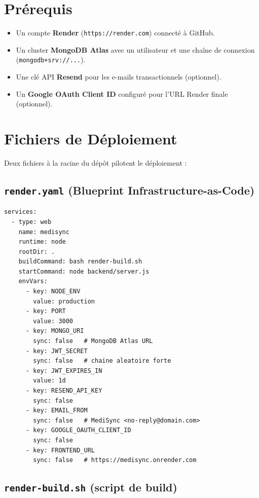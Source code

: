 \documentclass[12pt,a4paper]{report}
\begin{document}
\section{Prérequis}

\begin{itemize}[leftmargin=*,itemsep=2pt]
  \item Un compte \textbf{Render} (\texttt{https://render.com}) connecté à GitHub.
  \item Un cluster \textbf{MongoDB Atlas} avec un utilisateur et une chaîne de connexion (\texttt{mongodb+srv://...}).
  \item Une clé API \textbf{Resend} pour les e-mails transactionnels (optionnel).
  \item Un \textbf{Google OAuth Client ID} configuré pour l'URL Render finale (optionnel).
\end{itemize}

\section{Fichiers de Déploiement}

Deux fichiers à la racine du dépôt pilotent le déploiement :

\subsection{\texttt{render.yaml} (Blueprint Infrastructure-as-Code)}

\begin{lstlisting}[style=bash]
services:
  - type: web
    name: medisync
    runtime: node
    rootDir: .
    buildCommand: bash render-build.sh
    startCommand: node backend/server.js
    envVars:
      - key: NODE_ENV
        value: production
      - key: PORT
        value: 3000
      - key: MONGO_URI
        sync: false   # MongoDB Atlas URL
      - key: JWT_SECRET
        sync: false   # chaine aleatoire forte
      - key: JWT_EXPIRES_IN
        value: 1d
      - key: RESEND_API_KEY
        sync: false
      - key: EMAIL_FROM
        sync: false   # MediSync <no-reply@domain.com>
      - key: GOOGLE_OAUTH_CLIENT_ID
        sync: false
      - key: FRONTEND_URL
        sync: false   # https://medisync.onrender.com
\end{lstlisting}

\subsection{\texttt{render-build.sh} (script de build)}
\end{document}
